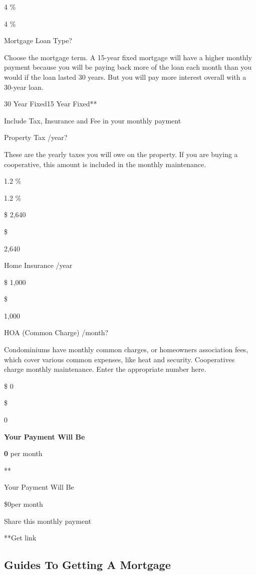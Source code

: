 4 \%

 4 \%

Mortgage Loan Type?

Choose the mortgage term. A 15-year fixed mortgage will have a higher
monthly payment because you will be paying back more of the loan each
month than you would if the loan lasted 30 years. But you will pay more
interest overall with a 30-year loan.

30 Year Fixed15 Year Fixed**

Include Tax, Insurance and Fee in your monthly payment

Property Tax /year?

These are the yearly taxes you will owe on the property. If you are
buying a cooperative, this amount is included in the monthly
maintenance.

1.2 \%

 1.2 \%

\$ 2,640

 \$

 2,640

Home Insurance /year

\$ 1,000

 \$

 1,000

HOA (Common Charge) /month?

Condominiums have monthly common charges, or homeowners association
fees, which cover various common expenses, like heat and security.
Cooperatives charge monthly maintenance. Enter the appropriate number
here.

\$ 0

 \$

 0

\protect\hyperlink{resultsContainer}{}

\textbf{Your Payment Will Be}

\textbf{0} per month

**

Your Payment Will Be

\$0per month

Share this monthly payment

**Get link

\hypertarget{guides-to-getting-a-mortgage-1}{%
\subsection{Guides To Getting A
Mortgage}\label{guides-to-getting-a-mortgage-1}}


